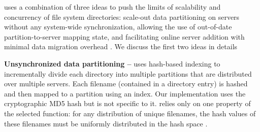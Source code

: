 \giga{} uses a combination of three ideas to push the limits of 
scalability and concurrency of file system directories: 
scale-out data partitioning on servers without any system-wide synchronization, 
allowing the use of out-of-date partition-to-server mapping state, and 
facilitating online server addition with minimal data migration overhead
\citep{GIGA}.
We discuss the first two ideas in details

\textbf{Unsynchronized data partitioning -- }
\giga{} uses hash-based indexing to incrementally divide each directory into
multiple partitions that are distributed over multiple servers.
Each filename (contained in a directory entry) is hashed and then mapped to a 
partition using an index. 
Our implementation uses the cryptographic MD5 hash but is not specific
to it.
\giga{} relies only on one property of the selected function: for any 
distribution of unique filenames, the hash values of these filenames must 
be uniformly distributed in the hash space \citep{md5:rfc1321}.

